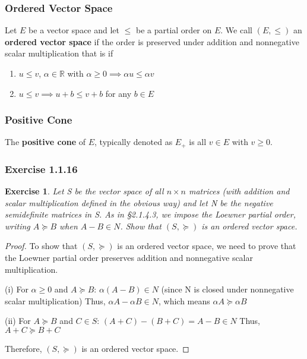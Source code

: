\documentclass[11pt,xcolor={dvipsnames},hyperref={pdftex,pdfpagemode=UseNone,hidelinks,pdfdisplaydoctitle=true},usepdftitle=false]{beamer}
\newtheorem{exercise}{Exercise}[section]
\begin{document}
\begin{frame}
\frametitle{Ordered Vector Space}
\begin{definition}
Let $E$ be a vector space and let $\le$ be a partial order on $E$. We call $(E, \le)$ an \textbf{ordered vector space} if the order is preserved under addition and nonnegative scalar multiplication that is if 
\begin{enumerate}
\item $u\le v$, $\alpha\in\mathbb{R}$ with $\alpha \ge 0 \implies \alpha u\le \alpha v$
\item $u\le v\implies u+ b\le v+b$ for any $b\in E$
\end{enumerate}
\end{definition}
\end{frame}
\begin{frame}
\frametitle{Positive Cone}
\begin{definition}
The \textbf{positive cone} of $E$, typically denoted as $E_+$ is all $v\in E$ with $v\ge 0$.
\end{definition}
\end{frame}
\begin{frame}
\frametitle{Exercise 1.1.16}
\begin{exercise}
Let S be the vector space of all $n \times n$ matrices (with addition and scalar multiplication defined in the obvious way) and let N be the negative semidefinite matrices in S. As in §2.1.4.3, we impose the Loewner partial order, writing $A \succeq B$ when $A - B \in N$. Show that $(S, \succeq)$ is an ordered vector space.
\end{exercise}

\begin{proof}
To show that $(S, \succeq)$ is an ordered vector space, we need to prove that the Loewner partial order preserves addition and nonnegative scalar multiplication.

(i) For $\alpha \geq 0$ and $A \succeq B$:
   $\alpha(A - B) \in N$ (since N is closed under nonnegative scalar multiplication)
   Thus, $\alpha A - \alpha B \in N$, which means $\alpha A \succeq \alpha B$

(ii) For $A \succeq B$ and $C \in S$:
   $(A + C) - (B + C) = A - B \in N$
   Thus, $A + C \succeq B + C$

Therefore, $(S, \succeq)$ is an ordered vector space.
\end{proof}
\end{frame}
\end{document}
